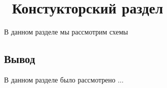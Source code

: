 \chapter{ Констукторский раздел}
\label{cha:design}

В данном разделе мы рассмотрим схемы
\section{Вывод}

В данном разделе было рассмотрено ...






